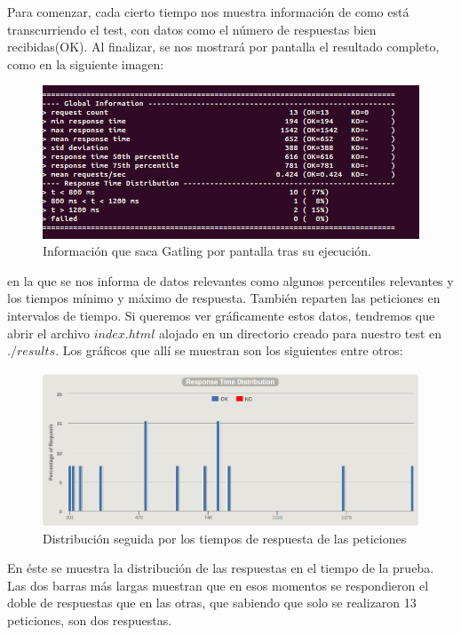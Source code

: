 \begin{itemize}
	Para comenzar, cada cierto tiempo nos muestra información de como está transcurriendo el test, con datos como el número de respuestas bien recibidas(OK). Al finalizar, se nos mostrará por pantalla el resultado completo, como en la siguiente imagen:\\
	
	
	\begin{figure}[H]
		\centering
		\includegraphics[width=0.7\linewidth]{globalInformationConsola}
		\caption[global Information Consola]{Información que saca Gatling por pantalla tras su ejecución.}
		\label{fig:globalInformationConsola}
	\end{figure}
	 
	en la que se nos informa de datos relevantes como algunos percentiles relevantes y los tiempos mínimo y máximo de respuesta. También reparten las peticiones en intervalos de tiempo. Si queremos ver gráficamente estos datos, tendremos que abrir el archivo $index.html$ alojado en un directorio creado para nuestro test en $./results$. Los gráficos que allí se muestran son los siguientes entre otros:\\
	
	\begin{figure}[H]
		\centering
		\includegraphics[width=0.7\linewidth]{distribucion-respuestas}
		\caption[Distribución respuestas]{Distribución seguida por los tiempos de respuesta de las peticiones}
		\label{fig:distribucion-respuestas}
	\end{figure}
	 En éste se muestra la distribución de las respuestas en el tiempo de la prueba. Las dos barras más largas muestran que en esos momentos se respondieron el doble de respuestas que en las otras, que sabiendo que solo se realizaron 13 peticiones, son dos respuestas.
	

\end{itemize}
